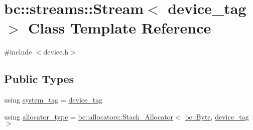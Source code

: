 \hypertarget{classbc_1_1streams_1_1Stream_3_01device__tag_01_4}{}\section{bc\+:\+:streams\+:\+:Stream$<$ device\+\_\+tag $>$ Class Template Reference}
\label{classbc_1_1streams_1_1Stream_3_01device__tag_01_4}


{\ttfamily \#include $<$device.\+h$>$}

\subsection*{Public Types}
\begin{DoxyCompactItemize}
\item 
using \hyperlink{classbc_1_1streams_1_1Stream_3_01device__tag_01_4_a03675e8b1fac42f89e8ef8b7fc6db22b}{system\+\_\+tag} = \hyperlink{structbc_1_1device__tag}{device\+\_\+tag}
\item 
using \hyperlink{classbc_1_1streams_1_1Stream_3_01device__tag_01_4_ad6e752fa317da0549e72b1d5118887ee}{allocator\+\_\+type} = \hyperlink{classbc_1_1allocators_1_1Stack__Allocator}{bc\+::allocators\+::\+Stack\+\_\+\+Allocator}$<$ \hyperlink{classbc_1_1allocators_1_1Byte}{bc\+::\+Byte}, \hyperlink{structbc_1_1device__tag}{device\+\_\+tag} $>$
\end{DoxyCompactItemize}

